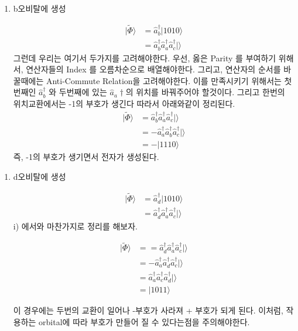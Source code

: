 \documentclass[10pt]{article}
\begin{document}
\begin{enumerate}[label=\(\mathrm{i}\))]
\item {b오비탈에 생성}

\begin{align*}
| \tilde{\Phi }\rangle & = \hat{a}_b^{\dagger}\vert 1010 \rangle \\
& = \hat{a}_b^{\dagger}\hat{a}_a^{\dagger}\hat{a}_c^{\dagger} \vert \rangle 
\end{align*}
그런데 우리는 여기서 두가지를 고려해야한다. 우선, 옳은 Parity 를 부여하기 위해서, 연산자들의 Index 를 오름차순으로 배열해야한다. 
그리고, 연산자의 순서를 바꿀때에는 Anti-Commute Relation을 고려해야한다. 
이를 만족시키기 위해서는 첫번째인 \(\hat{a}_b^{\dagger}\) 와 두번째에 있는 \(\hat{a}_a{\dagger}\)의 위치를 바꿔주어야 할것이다. 
그리고 한번의 위치교환에서는 -1의 부호가 생긴다 따라서 아래와같이 정리된다. 
\begin{align*}
| \tilde{\Phi }\rangle & = \hat{a}_b^{\dagger}\hat{a}_a^{\dagger}\hat{a}_c^{\dagger} \vert \rangle  \\
& = -\hat{a}_a^{\dagger}\hat{a}_b^{\dagger}\hat{a}_c^{\dagger} \vert \rangle \\
& = -\vert 1110 \rangle
\end{align*}
즉, -1의 부호가 생기면서 전자가 생성된다. 

\end{enumerate}

\begin{enumerate}[label=\(\mathrm{ii}\))]
\item {d오비탈에 생성}

\begin{align*}
| \tilde{\Phi }\rangle & = \hat{a}_d^{\dagger}\vert 1010 \rangle \\
& = \hat{a}_d^{\dagger}\hat{a}_a^{\dagger}\hat{a}_c^{\dagger} \vert \rangle 
\end{align*}
i) 에서와 마찬가지로 정리를 해보자. 

\begin{align*}
| \tilde{\Phi }\rangle & = = \hat{a}_d^{\dagger}\hat{a}_a^{\dagger}\hat{a}_c^{\dagger} \vert\rangle \\
& = -\hat{a}_a^{\dagger}\hat{a}_d^{\dagger}\hat{a}_c^{\dagger} \vert \rangle \\
& = \hat{a}_a^{\dagger}\hat{a}_c^{\dagger}\hat{a}_d^{\dagger} \vert \rangle  \\
& = \vert 1011 \rangle
\end{align*}

이 경우에는 두번의 교환이 일어나 -부호가 사라져 + 부호가 되게 된다. 
이처럼, 작용하는 orbital에 따라 부호가 만들어 질 수 있다는점을 주의해야한다. 

\end{enumerate}
\end{document}
